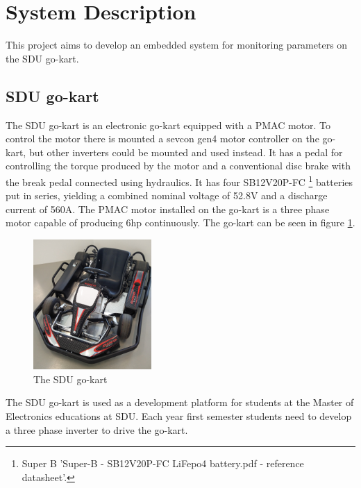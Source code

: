 \section{System Description}
\label{sec:system_description}
This project aims to develop an embedded system for monitoring parameters on the SDU go-kart.
\subsection{SDU go-kart}
The SDU go-kart is an electronic go-kart equipped with a PMAC motor. 
To control the motor there is mounted a sevcon gen4 motor controller on the go-kart, but other inverters could be mounted and used instead.
It has a pedal for controlling the torque produced by the motor and a conventional disc brake with the break pedal connected using hydraulics.
It has four SB12V20P-FC \footnote{Super B 'Super-B - SB12V20P-FC LiFepo4 battery.pdf - reference datasheet'.} batteries put in series, yielding a combined nominal voltage of 52.8V and a discharge current of 560A.
The PMAC motor installed on the go-kart is a three phase motor capable of producing 6hp continuously.
The go-kart can be seen in figure \ref{fig:go_kart}.

\begin{figure}[h]
 	\centering
    \includegraphics[width=0.4\textwidth]{graphics/go_kart}
    \caption{The SDU go-kart}
    \label{fig:go_kart}
\end{figure}

The SDU go-kart is used as a development platform for students at the Master of Electronics educations at SDU.
Each year first semester students need to develop a three phase inverter to drive the go-kart.

